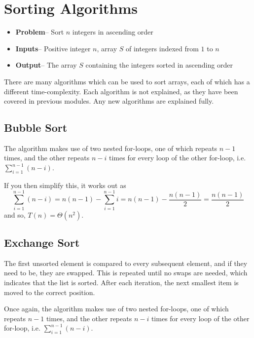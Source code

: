 
\section*{Sorting Algorithms}

\begin{itemize}
  \item \textbf{Problem}-- Sort $n$ integers in ascending order
  \item \textbf{Inputs}-- Positive integer $n$, array $S$ of integers indexed from $1$ to $n$
  \item \textbf{Output}-- The array $S$ containing the integers sorted in ascending order
\end{itemize}

There are many algorithms which can be used to sort arrays, each of which has a different time-complexity. Each
 algorithm is not explained, as they have been covered in previous modules. Any new algorithms are explained fully.

\subsection*{Bubble Sort}

The algorithm makes use of two nested for-loops, one of which repeats $n - 1$ times, and the other repeats $n - i$ times
 for every loop of the other for-loop, i.e. $\sum_{i=1}^{n-1} (n - i)$.

If you then simplify this, it works out as
\begin{equation*}
  \sum_{i=1}^{n-1} (n - i) = n(n-1) - \sum_{i=1}^{n-1} i = n(n - 1) - \frac{n(n-1)}{2} = \frac{n(n-1)}{2}
\end{equation*}
and so, $T(n) = \Theta(n^2)$.

\subsection*{Exchange Sort}

The first unsorted element is compared to every subsequent element, and if they need to be, they are swapped. This is
 repeated until no swaps are needed, which indicates that the list is sorted. After each iteration, the next smallest
 item is moved to the correct position.

Once again, the algorithm makes use of two nested for-loops, one of which repeats $n - 1$ times, and the other repeats
 $n - i$ times for every loop of the other for-loop, i.e. $\sum_{i=1}^{n-1} (n - i)$.

